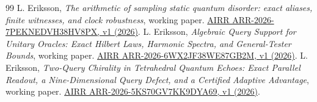 \documentclass[11pt,a4paper]{article}
\theoremstyle{remark}
\begin{document}
\begin{thebibliography}{99}
L. Eriksson, \emph{The arithmetic of sampling static quantum disorder:
exact aliases, finite witnesses, and clock robustness}, working paper.
\href{https://airr.science/papers/ARR-2026-7PEKNEDVH38HV8PX/versions/v1/}
{AIRR ARR-2026-7PEKNEDVH38HV8PX, v1 (2026)}.
L. Eriksson, \emph{Algebraic Query Support for Unitary Oracles: Exact
Hilbert Laws, Harmonic Spectra, and General-Tester Bounds}, working paper.
\href{https://airr.science/papers/ARR-2026-6WX2JF38WE87GB2M/versions/v1/}
{AIRR ARR-2026-6WX2JF38WE87GB2M, v1 (2026)}.
L. Eriksson, \emph{Two-Query Chirality in Tetrahedral Quantum Echoes:
Exact Parallel Readout, a Nine-Dimensional Query Defect, and a Certified
Adaptive Advantage}, working paper.
\href{https://airr.science/papers/ARR-2026-5KS70GV7KK9DYA69/versions/v1/}
{AIRR ARR-2026-5KS70GV7KK9DYA69, v1 (2026)}.
\end{thebibliography}
\end{document}
